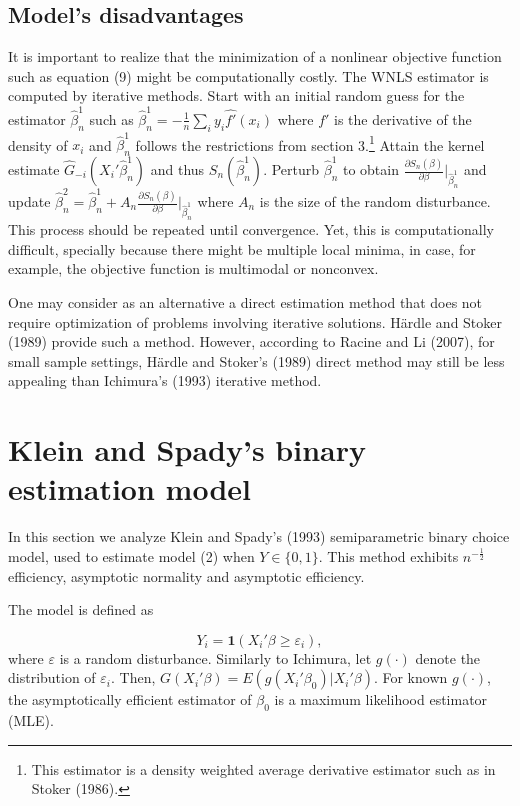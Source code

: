\documentclass[a4paper]{article}
\begin{document}
\subsection{Model's disadvantages} %
\label{sub:Model's disadvantages}


It is important to realize that the minimization of a nonlinear objective function such as equation (9) might be computationally costly. The WNLS estimator is computed by iterative methods. Start with an initial random guess for the estimator $\hat{\beta}_n^{1}$ such as $\hat{\beta}_n^{1} = - \frac{1}{n}\sum_i y_i\hat{f'}(x_i)$ where $f'$ is the derivative of the density of $x_i$ and $\hat{\beta}_n^{1}$ follows the restrictions from section 3.\footnote{This estimator is a density weighted average derivative estimator such as in Stoker (1986).} Attain the kernel estimate $\hat{G}_{-i}(X_i'\hat{\beta}_n^{1})$ and thus $S_n(\hat{\beta}_n^{1})$. Perturb $\hat{\beta}_n^{1}$ to obtain $\frac{\partial S_n(\beta)}{\partial\beta} |_{\hat{\beta}_n^{1}}$ and update $\hat{\beta}_n^{2} = \hat{\beta}_n^{1} + A_n  \frac{ \partial S_n(\beta)}{\partial\beta}|_{\hat{\beta}_n^{1}}$ where $A_n$ is the size of the random disturbance. This process should be repeated until convergence. Yet, this is computationally difficult, specially because there might be multiple local minima, in case, for example, the objective function is multimodal or nonconvex. 

One may consider  as an alternative a direct estimation method that does not require optimization of problems involving iterative solutions.  H{\"a}rdle and Stoker (1989) provide such a method. However, according to Racine and Li (2007), for small sample settings, H{\"a}rdle and Stoker's (1989) direct method may still be less appealing than Ichimura's (1993) iterative method.

\section{Klein and Spady's binary estimation model} %
\label{sec:section_about_references_within_the_document}
In this section we analyze Klein and Spady's (1993) semiparametric binary choice model, used to estimate model (2) when $Y \in \{0,1\}$.   This method exhibits $n^{-\frac{1}{2}}$ efficiency, asymptotic normality and asymptotic efficiency. 

The model is defined as

\begin{equation}
Y_i =  \mathbf{1}{(X_i'\beta \geq \varepsilon_i)},
\end{equation}
where $\varepsilon$ is a random disturbance. Similarly to Ichimura, let $g(\cdot)$ denote the distribution of $\varepsilon_i$. Then, $G(X_i'\beta) = E(g(X_i'\beta_0)|X_i'\beta)$. For known $g(\cdot)$, the asymptotically efficient estimator of $\beta_0$ is a maximum likelihood estimator (MLE). 
\end{document}
